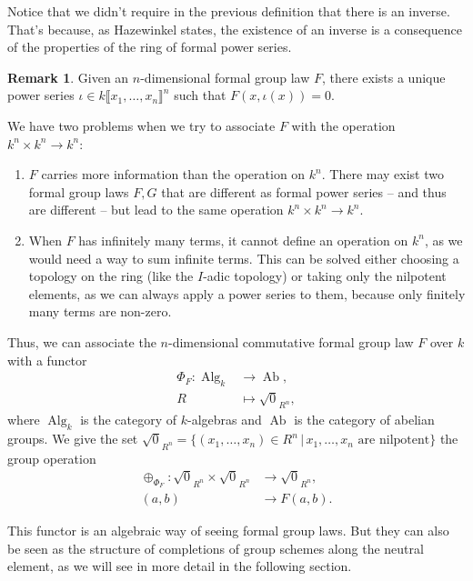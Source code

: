 \documentclass{report}
\DeclareMathOperator{\Alg}{Alg}
\DeclareMathOperator{\Ab}{Ab}
\theoremstyle{definition}
\newtheorem{remark}[equation]{Remark}
\begin{document}
Notice that we didn't require in the previous definition that there is an inverse. That's because, as Hazewinkel \cite[Section~II.9.1]{hazewinkel1978formal} states, the existence of an inverse is a consequence of the properties of the ring of formal power series.

\begin{remark}
Given an $n$-dimensional formal group law $F$, there exists a unique power series $\iota\in k\llbracket x_1,\ldots,x_n\rrbracket^n$ such that $F(x,\iota(x))=0$.
\end{remark}

We have two problems when we try to associate $F$ with the operation $k^n\times k^n\rightarrow k^n$:
\begin{enumerate}
\item $F$ carries more information than the operation on $k^n$. There may exist two formal group laws $F,G$ that are different as formal power series -- and thus are different -- but lead to the same operation $k^n\times k^n\rightarrow k^n$.

\item When $F$ has infinitely many terms, it cannot define an operation on $k^n$, as we would need a way to sum infinite terms. This can be solved either choosing a topology on the ring (like the $I$-adic topology) or taking only the nilpotent elements, as we can always apply a power series to them, because only finitely many terms are non-zero.
\end{enumerate}

Thus, we can associate the $n$-dimensional commutative formal group law $F$ over $k$ with a functor
\begin{align*}
\Phi_F:\Alg_k&\longrightarrow\Ab,\\
R&\longmapsto\sqrt{0}_{R^n},
\end{align*}
where $\Alg_k$ is the category of $k$-algebras and $\Ab$ is the category of abelian groups. We give the set $\sqrt{0}_{R^n}=\{(x_1,\ldots,x_n)\in R^n\,|\,x_1,\ldots,x_n\text{ are nilpotent}\}$ the group operation
\begin{align*}
\oplus_{\Phi_F}:\sqrt{0}_{R^n}\times\sqrt{0}_{R^n}&\longrightarrow\sqrt{0}_{R^n},\\
(a,b)&\longrightarrow F(a,b).
\end{align*}

This functor is an algebraic way of seeing formal group laws. But they can also be seen as the structure of completions of group schemes along the neutral element, as we will see in more detail in the following section.
\end{document}
